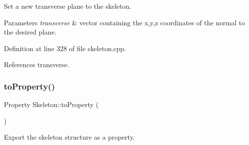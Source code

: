 Set a new transverse plane to the skeleton. 


\begin{DoxyParams}{Parameters}
{\em transverse} & vector containing the x,y,z coordinates of the normal to the desired plane. \\
\hline
\end{DoxyParams}


Definition at line 328 of file skeleton.\+cpp.


\begin{DoxyCode}{0}

\end{DoxyCode}


References transverse.

\mbox{\label{classassistive__rehab_1_1Skeleton_ad58ea53a165abc3f39a3c46594f0560f}} 
\subsubsection{\texorpdfstring{toProperty()}{toProperty()}}
{\footnotesize\ttfamily Property Skeleton\+::to\+Property (\begin{DoxyParamCaption}{ }\end{DoxyParamCaption})\hspace{0.3cm}{\ttfamily [virtual]}}



Export the skeleton structure as a property. 

